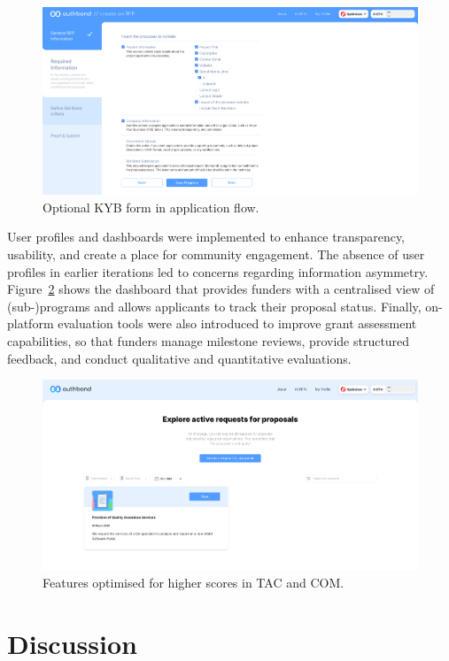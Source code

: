 \documentclass[conference]{IEEEtran}
\begin{document}
\begin{figure}[htbp]
\centerline{\includegraphics[scale=0.1]{KYB-optional.png}}
\caption{Optional KYB form in application flow.}
\label{fig:kyb-optional}
\end{figure}

User profiles and dashboards were implemented to enhance transparency, usability, and create a place for community engagement. The absence of user profiles in earlier iterations led to concerns regarding information asymmetry. Figure~\ref{fig:all-rfps} shows the dashboard that provides funders with a centralised view of (sub-)programs and allows applicants to track their proposal status. Finally, on-platform evaluation tools were also introduced to improve grant assessment capabilities, so that funders manage milestone reviews, provide structured feedback, and conduct qualitative and quantitative evaluations.

\begin{figure}[htbp]
\centerline{\includegraphics[scale=0.1]{all-rfps.png}}
\caption{Features optimised for higher scores in TAC and COM.}
\label{fig:all-rfps}
\end{figure}

\section{Discussion}\label{sec_5}
\end{document}
